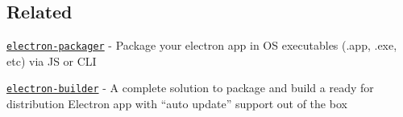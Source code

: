 \subsection*{Related}


\begin{DoxyItemize}
\item \href{https://github.com/electron-userland/electron-packager}{\tt electron-\/packager} -\/ Package your electron app in OS executables (.app, .exe, etc) via JS or C\+LI
\item \href{https://github.com/electron-userland/electron-builder}{\tt electron-\/builder} -\/ A complete solution to package and build a ready for distribution Electron app with “auto update” support out of the box 
\end{DoxyItemize}